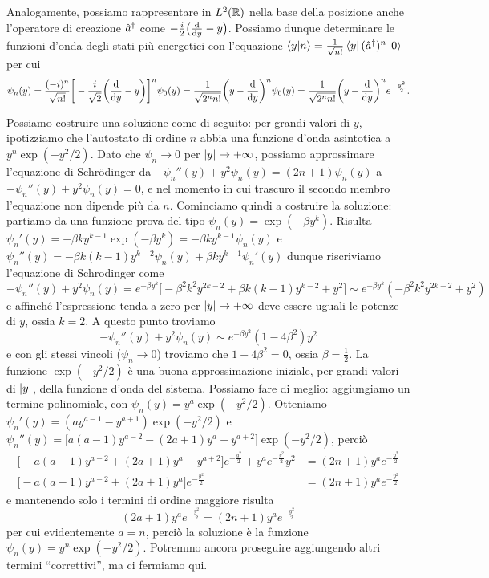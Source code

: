 Analogamente, possiamo rappresentare in $L^2(\mathbb{R})$ nella base della posizione anche l'operatore di creazione ${\hat{a}}^\dagger$ come $-\frac{i}2\big(\frac{\textup{d} {}}{\textup{d} {y}}-y\big)$.
Possiamo dunque determinare le funzioni d'onda degli stati più energetici con l'equazione $\left\langle{y}\middle|{n}\right\rangle=\frac1{\sqrt{n!}}\left\langle{y}\right|({\hat{a}}^\dagger)^n\left|{0}\right\rangle$ per cui
\begin{equation}
	\psi_n(y)=\frac{(-i)^n}{\sqrt{n!}}\bigg[-\frac{i}{\sqrt{2}}\bigg(\frac{\textup{d} {}}{\textup{d} {y}}-y\bigg)\bigg]^n\psi_0(y)=\frac1{\sqrt{2^nn!}}\bigg(y-\frac{\textup{d} {}}{\textup{d} {y}}\bigg)^n\psi_0(y)=\frac1{\sqrt{2^nn!}}\bigg(y-\frac{\textup{d} {}}{\textup{d} {y}}\bigg)^ne^{-\frac{y^2}2}.
\end{equation}

Possiamo costruire una soluzione come di seguito: per grandi valori di $y$, ipotizziamo che l'autostato di ordine $n$ abbia una funzione d'onda asintotica a $y^n\exp(-y^2/2)$.
Dato che $\psi_n\to 0$ per $\left|{y}\right|\to+\infty$, possiamo approssimare l'equazione di Schr\"odinger da $-\psi_n''(y)+y^2\psi_n(y)=(2n+1)\psi_n(y)$ a $-\psi_n''(y)+y^2\psi_n(y)=0$, e nel momento in cui trascuro il secondo membro l'equazione non dipende più da $n$.
Cominciamo quindi a costruire la soluzione: partiamo da una funzione prova del tipo $\psi_n(y)=\exp(-\beta y^k)$.
Risulta $\psi_n'(y)=-\beta ky^{k-1}\exp(-\beta y^k)=-\beta ky^{k-1}\psi_n(y)$ e $\psi_n''(y)=-\beta k(k-1)y^{k-2}\psi_n(y)+\beta ky^{k-1}\psi_n'(y)$ dunque riscriviamo l'equazione di Schrodinger come
\begin{equation}
	-\psi_n''(y)+y^2\psi_n(y)=e^{-\beta y^k}\big[-\beta^2k^2y^{2k-2}+\beta k(k-1)y^{k-2}+y^2\big]\sim e^{-\beta y^k}(-\beta^2k^2y^{2k-2}+y^2)
\end{equation}
e affinch\'e l'espressione tenda a zero per $\left|{y}\right|\to+\infty$ deve essere uguali le potenze di $y$, ossia $k=2$.
A questo punto troviamo
\begin{equation}
	-\psi_n''(y)+y^2\psi_n(y)\sim e^{-\beta y^2}(1-4\beta^2)y^2
\end{equation}
e con gli stessi vincoli ($\psi_n\to 0$) troviamo che $1-4\beta^2=0$, ossia $\beta=\frac12$.
La funzione $\exp(-y^2/2)$ è una buona approssimazione iniziale, per grandi valori di $\left|{y}\right|$, della funzione d'onda del sistema.
Possiamo fare di meglio: aggiungiamo un termine polinomiale, con $\psi_n(y)=y^a\exp(-y^2/2)$.
Otteniamo $\psi_n'(y)=(ay^{a-1}-y^{a+1})\exp(-y^2/2)$ e $\psi_n''(y)=\big[a(a-1)y^{a-2}-(2a+1)y^a+y^{a+2}\big]\exp(-y^2/2)$, perciò
\begin{equation}
	\begin{aligned}
		\big[-a(a-1)y^{a-2}+(2a+1)y^a-y^{a+2}\big]e^{-\frac{y^2}2}+y^ae^{-\frac{y^2}2}y^2&=(2n+1)y^ae^{-\frac{y^2}2}\\
		\big[-a(a-1)y^{a-2}+(2a+1)y^a\big]e^{-\frac{y^2}2}&=(2n+1)y^ae^{-\frac{y^2}2}
	\end{aligned}
\end{equation}
e mantenendo solo i termini di ordine maggiore risulta
\begin{equation}
	(2a+1)y^ae^{-\frac{y^2}2}=(2n+1)y^ae^{-\frac{y^2}2}
\end{equation}
per cui evidentemente $a=n$, perciò la soluzione è la funzione $\psi_n(y)=y^n\exp(-y^2/2)$.
Potremmo ancora proseguire aggiungendo altri termini ``correttivi'', ma ci fermiamo qui.
